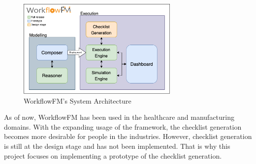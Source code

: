 
\begin{figure}
    \centering
    \includegraphics[width=0.7\textwidth]{overleaf/images/workflowfm-system.png}
    \caption{WorkflowFM's System Architecture}
    \label{fig:workflowfm-system}
\end{figure}

As of now, WorkflowFM has been used in the healthcare and manufacturing domains. With the expanding usage of the framework, the checklist generation becomes more desirable for people in the industries. However, checklist generation is still at the design stage and has not been implemented. That is why this project focuses on implementing a prototype of the checklist generation.


